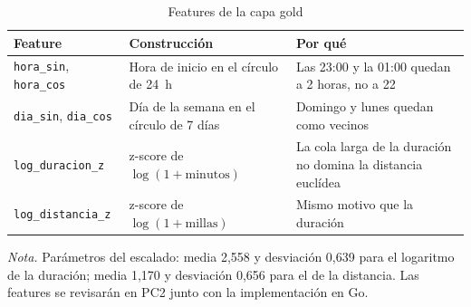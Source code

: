 \begin{table}[H]
\caption{Features de la capa gold}\label{tab:features}
\small
\begin{tabularx}{\textwidth}{@{}L{3.5cm}L{4.4cm}Y@{}}
\toprule
\textbf{Feature} & \textbf{Construcción} & \textbf{Por qué} \\
\midrule
\texttt{hora\_sin}, \texttt{hora\_cos} & Hora de inicio en el círculo de 24~h
  & Las 23:00 y la 01:00 quedan a 2 horas, no a 22 \\
\addlinespace
\texttt{dia\_sin}, \texttt{dia\_cos} & Día de la semana en el círculo de 7 días
  & Domingo y lunes quedan como vecinos \\
\addlinespace
\texttt{log\_duracion\_z} & z-score de $\log(1 + \text{minutos})$
  & La cola larga de la duración no domina la distancia euclídea \\
\addlinespace
\texttt{log\_distancia\_z} & z-score de $\log(1 + \text{millas})$ & Mismo motivo que la duración \\
\bottomrule
\end{tabularx}

{\footnotesize\textit{Nota.} Parámetros del escalado: media 2,558 y desviación 0,639 para el
logaritmo de la duración; media 1,170 y desviación 0,656 para el de la distancia. Las features se
revisarán en PC2 junto con la implementación en Go.\par}
\end{table}

